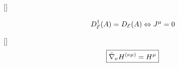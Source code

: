 []

\begin{equation}
  D^\dagger _{\mathcal{E}} (A)=D_{\mathcal{E}} (A) \Leftrightarrow J^\mu =0
\end{equation}

[]
\begin{equation}
\boxed{  \tilde{\nabla}_\nu H^{(\nu\mu) }=H^\mu }
\end{equation}
























































